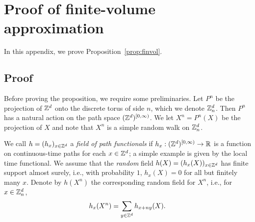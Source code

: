 
\renewcommand{\appendicesname}{Appendix}

\appendix

\chapter{Proof of finite-volume approximation}
\label{sec:finvol}

In this appendix, we prove Proposition~\ref{prop:finvol}.



\section{Proof}

Before proving the proposition, we require some preliminaries.
Let $P^n$ be the projection
of ${ {{\mathbb Z}}^d }$ onto the discrete torus of side $n$,
which we denote ${\mathbb Z}_n^d$.
Then $P^n$ has a natural action
on the path space $({ {{\mathbb Z}}^d })^{[0,\infty)}$. We let
$X^n = P^n(X)$ be the projection of $X$
and note that $X^n$ is a simple random walk on ${\mathbb Z}^d_n$.

We call $h = (h_x)_{x\in{ {{\mathbb Z}}^d }}$ a \emph{field of path functionals} if
$h_x : ({ {{\mathbb Z}}^d })^{[0,\infty)} \rightarrow {\mathbb R}$ is a function on continuous-time paths
for each $x \in { {{\mathbb Z}}^d }$;
a simple example is given by the local time functional.
We assume that the \emph{random} field $h(X) = (h_x(X))_{x\in{ {{\mathbb Z}}^d }}$
has finite support almost surely, i.e.,
with probability $1$, $h_x(X) = 0$ for all but finitely many $x$.
Denote by $h(X^n)$ the corresponding random field for $X^n$, i.e., for $x \in {\mathbb Z}_n^d$,
\begin{equation}
h_x(X^n) = \sum_{y\in{ {{\mathbb Z}}^d }} h_{x+ny}(X).
\end{equation}


